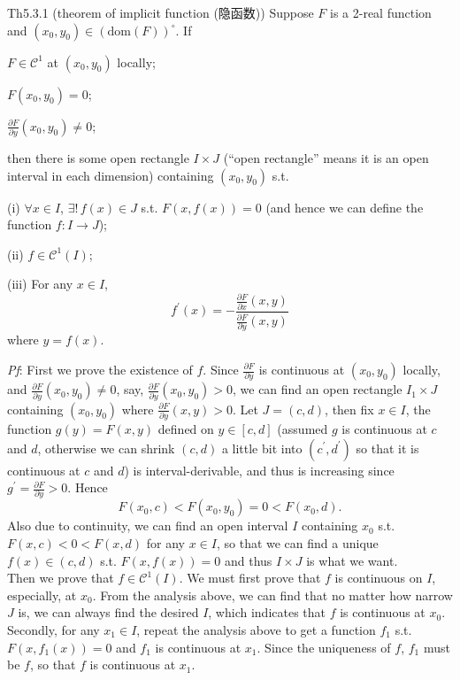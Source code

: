 \documentclass{article}
\newcommand{\parfrac}[2]{\frac{\partial #1}{\partial #2}}
\begin{document}
\begin{Th}{Th5.3.1 (theorem of implicit function (隐函数))}
    Suppose $F$ is a 2-real function and $(x_0, y_0)\in (\text{dom}(F))^\circ$. If
    \begin{compactenum}
        \item $F\in\mathcal{C}^1$ at $(x_0, y_0)$ locally;
        \item $F(x_0, y_0) = 0$;
        \item $\parfrac{F}{y}(x_0, y_0)\neq 0$;
    \end{compactenum}
    then there is some open rectangle $I\times J$ (``open rectangle'' means it is an open interval in each dimension) containing $(x_0, y_0)$ s.t.
    \begin{compactenum}
        \item[(i)] $\forall x\in I$, $\exists!\, f(x)\in J$ s.t. $F(x, f(x)) = 0$ (and hence we can define the function $f: I\rightarrow J$);
        \item[(ii)] $f\in\mathcal{C}^1(I)$;
        \item[(iii)] For any $x\in I$,
        \begin{equation}
            f^\prime (x) = -\frac{\parfrac{F}{x}(x, y)}{\parfrac{F}{y}(x, y)}
            \tag{1}
        \end{equation}
        where $y=f(x)$.
    \end{compactenum}
    \tcblower
    \textit{Pf}: First we prove the existence of $f$. Since $\parfrac{F}{y}$ is continuous at $(x_0, y_0)$ locally, and $\parfrac{F}{y}(x_0, y_0)\neq 0$, say, $\parfrac{F}{y}(x_0, y_0) > 0$, we can find an open rectangle $I_1\times J$ containing $(x_0, y_0)$ where $\parfrac{F}{y}(x, y) > 0$. 
    Let $J = (c, d)$, then fix $x\in I$, the function $g(y) = F(x, y)$ defined on $y\in [c,d]$ (assumed $g$ is continuous at $c$ and $d$, otherwise we can shrink $(c,d)$ a little bit into $(c^\prime, d^\prime)$ so that it is continuous at $c$ and $d$) is interval-derivable, and thus is increasing since $g^\prime = \parfrac{F}{y} > 0$. Hence
    $$ F(x_0,c) < F(x_0, y_0) = 0 < F(x_0,d). $$
    Also due to continuity, we can find an open interval $I$ containing $x_0$ s.t. $ F(x,c) < 0 < F(x,d) $ for any $x\in I$, so that we can find a unique $f(x)\in (c,d)$ s.t. $F(x, f(x))=0$ and thus $I\times J$ is what we want.\\
    Then we prove that $f\in\mathcal{C}^1 (I)$. We must first prove that $f$ is continuous on $I$, especially, at $x_0$. From the analysis above, we can find that no matter how narrow $J$ is, we can always find the desired $I$, which indicates that $f$ is continuous at $x_0$. Secondly, for any $x_1\in I$, repeat the analysis above to get a function $f_1$ s.t. $F(x, f_1(x)) = 0$ and $f_1$ is continuous at $x_1$. Since the uniqueness of $f$, $f_1$ must be $f$, so that $f$ is continuous at $x_1$.\\

\end{Th}
\end{document}
